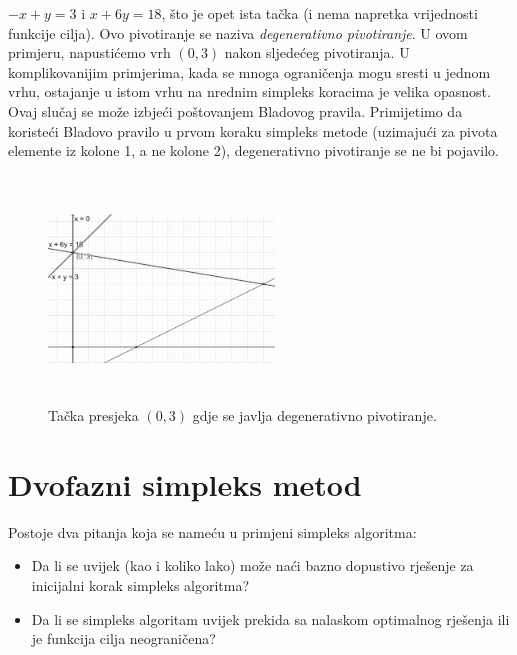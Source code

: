\documentclass[a4paper, utf8, 11pt, colorlinks]{book}
\begin{document}
$-x+y=3$ i $x+6y=18$, što je opet ista tačka (i nema napretka vrijednosti funkcije cilja). 
 Ovo pivotiranje se naziva \emph{degenerativno pivotiranje}. U ovom primjeru, napustićemo vrh $(0,3)$ nakon sljedećeg pivotiranja. U komplikovanijim primjerima, kada se mnoga ograničenja mogu sresti u jednom vrhu, ostajanje u istom vrhu na nrednim simpleks koracima je velika opasnost. Ovaj slučaj se može izbjeći poštovanjem 
 Bladovog pravila. Primijetimo da koristeći Bladovo pravilo u prvom koraku simpleks metode (uzimajući za pivota elemente iz kolone 1, a ne kolone 2), degenerativno pivotiranje se ne bi pojavilo.  


\begin{figure}[!ht]
	\centering
	\includegraphics[width=170pt,height=170pt]{deg-sol.eps}
	\caption{Tačka presjeka $(0,3)$ gdje se javlja degenerativno pivotiranje.}
	\label{fig:deg-sol}
\end{figure}

 \section{Dvofazni simpleks metod}
 Postoje dva pitanja koja se nameću u primjeni simpleks algoritma:
 \begin{itemize}
     \item Da li se uvijek (kao i koliko lako)   može naći bazno dopustivo rješenje za inicijalni korak 
     simpleks algoritma?
     \item Da li se simpleks algoritam uvijek prekida sa nalaskom optimalnog rješenja ili je funkcija cilja neograničena?
 \end{itemize}
 
\end{document}
